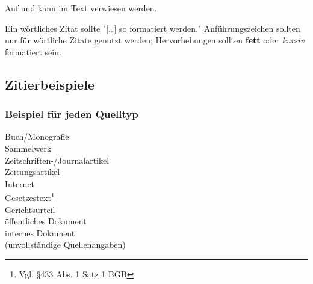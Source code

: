 

Auf  und  kann im Text verwiesen werden.%

Ein wörtliches Zitat sollte "[\ldots] so formatiert werden." %
Anführungszeichen sollten nur für wörtliche Zitate genutzt werden; Hervorhebungen sollten \textbf{fett} oder \textit{kursiv} formatiert sein.

\newpage
\subsection{Zitierbeispiele}
\subsubsection{Beispiel für jeden Quelltyp}

Buch/Monografie\\
Sammelwerk\\
Zeitschriften-/Journalartikel\\
Zeitungsartikel\\
Internet\\%
Gesetzestext\footnote{Vgl. §433 Abs. 1 Satz 1 BGB}\nocite{bgb}\\
Gerichtsurteil\\
öffentliches Dokument\\
internes Dokument\\%
(unvollständige Quellenangaben)

